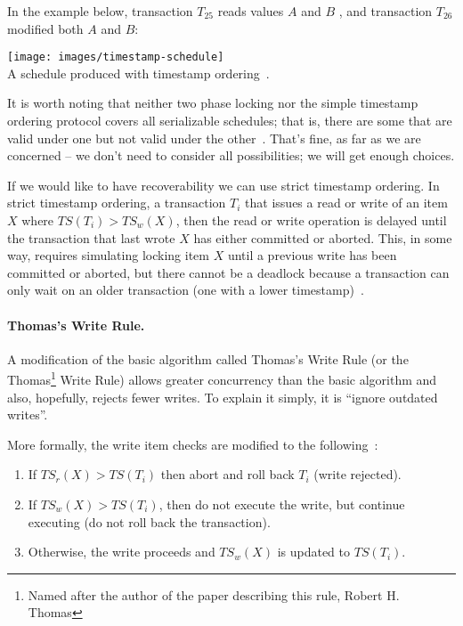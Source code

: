 \documentclass[a4paper]{report}
\begin{document}
In the example below, transaction $T_{25}$ reads values $A$ and $B$ , and transaction $T_{26}$ modified both $A$ and $B$:

\begin{center}
	\texttt{[image: images/timestamp-schedule]}\\
	A schedule produced with timestamp ordering~\cite{dsc}.
\end{center}

It is worth noting that neither two phase locking nor the simple timestamp ordering protocol covers all serializable schedules; that is, there are some that are valid under one but not valid under the other~\cite{fds}. That's fine, as far as we are concerned -- we don't need to consider all possibilities; we will get enough choices.

If we would like to have recoverability we can use strict timestamp ordering. In strict timestamp ordering, a transaction $T_{i}$ that issues a read or write of an item $X$ where $T\!S(T_{i}) > T\!S_{w}(X)$, then the read or write operation is delayed until the transaction that last wrote $X$ has either committed or aborted. This, in some way, requires simulating locking item $X$ until a previous write has been committed or aborted, but there cannot be a deadlock because a transaction can only wait on an older transaction (one with a  lower timestamp)~\cite{fds}.

\paragraph{Thomas's Write Rule.} A modification of the basic algorithm called Thomas's Write Rule (or the Thomas\footnote{Named after the author of the paper describing this rule, Robert H. Thomas} Write Rule) allows greater concurrency than the basic algorithm and also, hopefully, rejects fewer writes. To explain it simply, it is ``ignore outdated writes''.

More formally, the write item checks are modified to the following~\cite{fds}:
\begin{enumerate}
	\item If $T\!S_{r}(X) > T\!S(T_{i})$ then abort and roll back $T_{i}$ (write rejected).
	\item If $T\!S_{w}(X) > T\!S(T_{i})$, then do not execute the write, but continue executing (do not roll back the transaction).
	\item Otherwise, the write proceeds and $T\!S_{w}(X)$ is updated to $T\!S(T_{i})$. 
\end{enumerate}
\end{document}
